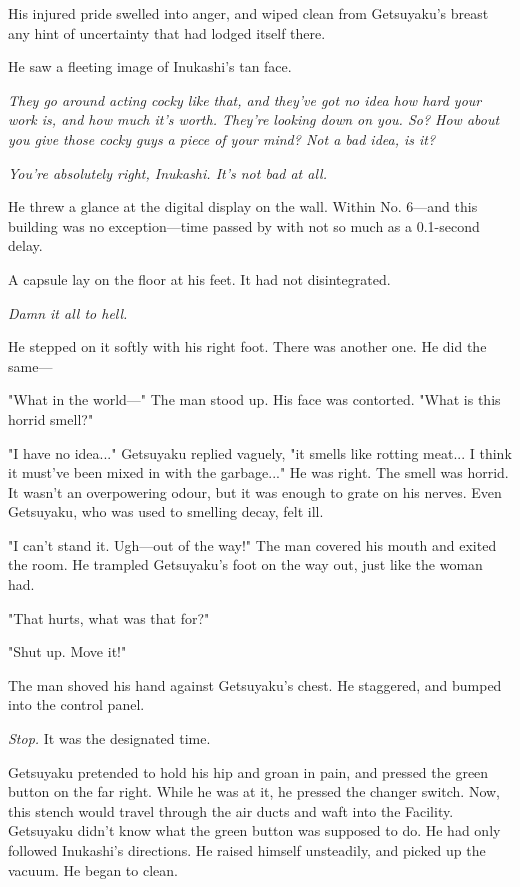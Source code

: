 His injured pride swelled into anger, and wiped clean from Getsuyaku's
breast any hint of uncertainty that had lodged itself there.

He saw a fleeting image of Inukashi's tan face.

\emph{They go around acting cocky like that, and they've got no idea how hard
your work is, and how much it's worth. They're looking down on you. So?
How about you give those cocky guys a piece of your mind? Not a bad
idea, is it?}

\emph{You're absolutely right, Inukashi. It's not bad at all.}

He threw a glance at the digital display on the wall. Within No. 6---and
this building was no exception---time passed by with not so much as a
0.1-second delay.

A capsule lay on the floor at his feet. It had not disintegrated.

\emph{Damn it all to hell.}

He stepped on it softly with his right foot. There was another one. He
did the same---

"What in the world---" The man stood up. His face was contorted. "What is
this horrid smell?"

"I have no idea..." Getsuyaku replied vaguely, "it smells like rotting
meat... I think it must've been mixed in with the garbage..." He was
right. The smell was horrid. It wasn't an overpowering odour, but it was
enough to grate on his nerves. Even Getsuyaku, who was used to smelling
decay, felt ill.

"I can't stand it. Ugh---out of the way!" The man covered his mouth and
exited the room. He trampled Getsuyaku's foot on the way out, just like
the woman had.

"That hurts, what was that for?"

"Shut up. Move it!"

The man shoved his hand against Getsuyaku's chest. He staggered, and
bumped into the control panel.

\emph{Stop.} It was the designated time.

Getsuyaku pretended to hold his hip and groan in pain, and pressed the
green button on the far right. While he was at it, he pressed the
changer switch. Now, this stench would travel through the air ducts and
waft into the Facility. Getsuyaku didn't know what the green button was
supposed to do. He had only followed Inukashi's directions. He raised
himself unsteadily, and picked up the vacuum. He began to clean.

